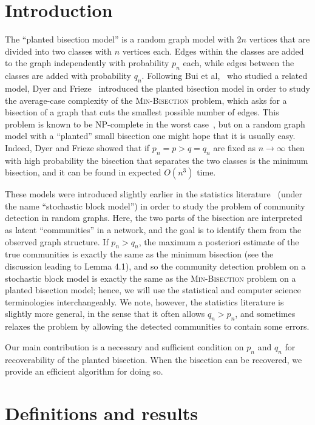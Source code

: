 \documentclass[EJP,final]{ejpecp}
\newcommand{\1}[1]{\mathbbm{1}_{\{#1\}}}
\begin{document}
\section{Introduction}

The ``planted bisection model'' is a random graph model with $2n$ vertices that
are divided into two classes with $n$ vertices each. Edges within the classes
are added to the graph independently with probability $p_n$ each, while edges
between the classes are added with probability $q_n$.
Following Bui et al,~\cite{BCLS:87} who studied a related model,
Dyer and Frieze~\cite{DF:89} introduced the planted bisection model
in order to study the average-case complexity of the
\textsc{Min-Bisection} problem, which asks for a bisection of a graph that cuts
the smallest possible number of edges. This problem is known to be
NP-complete in the worst case~\cite{Karp:72}, but on a random graph model with a
``planted'' small bisection one might hope that it is usually easy.
Indeed, Dyer and Frieze showed that if $p_n = p > q = q_n$ are fixed
as $n \to \infty$ then with high probability the bisection that separates the
two classes is the minimum bisection, and it can be found in expected $O(n^3)$
time.

These models were introduced slightly earlier in the statistics literature~\cite{HLL:83}
(under the name ``stochastic block model'')
in order to study the problem of community detection in random graphs.
Here, the two parts of the bisection are interpreted as latent ``communities'' in a
network, and the goal is to identify them from the observed graph structure.
If $p_n > q_n$,
the maximum a posteriori estimate of the true communities is exactly the same
as the minimum bisection (see the discussion leading to Lemma 4.1),
and so the community detection problem on a stochastic
block model is exactly the same as the \textsc{Min-Bisection}
problem on a planted bisection model; hence, we will use the statistical and computer science
terminologies interchangeably. We note, however, the statistics literature is slightly more
general, in the sense that it often
allows $q_n > p_n$, and sometimes relaxes the problem by allowing the detected communities
to contain some errors.

Our main contribution is a necessary and sufficient condition on
$p_n$ and $q_n$ for recoverability of the planted bisection.
When the bisection can be recovered, we provide an efficient algorithm
for doing so.

\section{Definitions and results}
\end{document}
